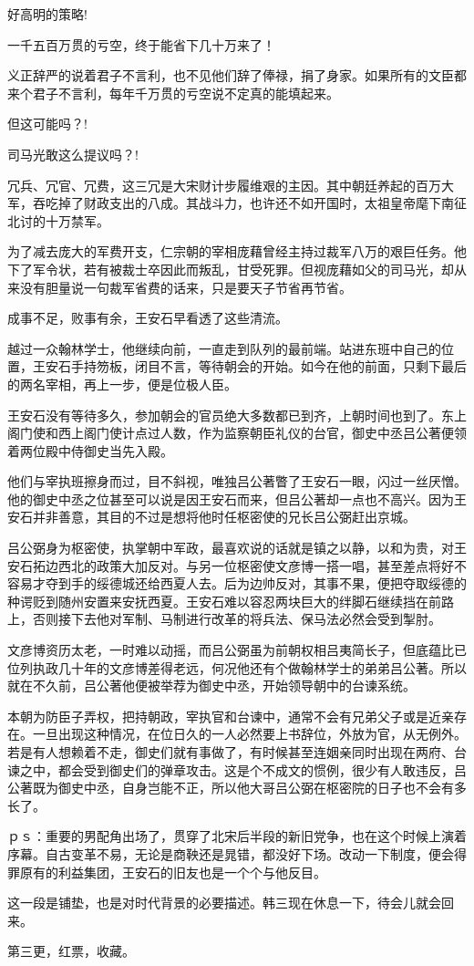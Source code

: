 好高明的策略!

一千五百万贯的亏空，终于能省下几十万来了！

义正辞严的说着君子不言利，也不见他们辞了俸禄，捐了身家。如果所有的文臣都来个君子不言利，每年千万贯的亏空说不定真的能填起来。

但这可能吗？!

司马光敢这么提议吗？!

冗兵、冗官、冗费，这三冗是大宋财计步履维艰的主因。其中朝廷养起的百万大军，吞吃掉了财政支出的八成。其战斗力，也许还不如开国时，太祖皇帝麾下南征北讨的十万禁军。

为了减去庞大的军费开支，仁宗朝的宰相庞藉曾经主持过裁军八万的艰巨任务。他下了军令状，若有被裁士卒因此而叛乱，甘受死罪。但视庞藉如父的司马光，却从来没有胆量说一句裁军省费的话来，只是要天子节省再节省。

成事不足，败事有余，王安石早看透了这些清流。

越过一众翰林学士，他继续向前，一直走到队列的最前端。站进东班中自己的位置，王安石手持笏板，闭目不言，等待朝会的开始。如今在他的前面，只剩下最后的两名宰相，再上一步，便是位极人臣。

王安石没有等待多久，参加朝会的官员绝大多数都已到齐，上朝时间也到了。东上阁门使和西上阁门使计点过人数，作为监察朝臣礼仪的台官，御史中丞吕公著便领着两位殿中侍御史当先入殿。

他们与宰执班擦身而过，目不斜视，唯独吕公著瞥了王安石一眼，闪过一丝厌憎。他的御史中丞之位甚至可以说是因王安石而来，但吕公著却一点也不高兴。因为王安石并非善意，其目的不过是想将他时任枢密使的兄长吕公弼赶出京城。

吕公弼身为枢密使，执掌朝中军政，最喜欢说的话就是镇之以静，以和为贵，对王安石拓边西北的政策大加反对。与另一位枢密使文彦博一搭一唱，甚至差点将好不容易才夺到手的绥德城还给西夏人去。后为边帅反对，其事不果，便把夺取绥德的种谔贬到随州安置来安抚西夏。王安石难以容忍两块巨大的绊脚石继续挡在前路上，否则接下去他对军制、马制进行改革的将兵法、保马法必然会受到掣肘。

文彦博资历太老，一时难以动摇，而吕公弼虽为前朝权相吕夷简长子，但底蕴比已位列执政几十年的文彦博差得老远，何况他还有个做翰林学士的弟弟吕公著。所以就在不久前，吕公著他便被举荐为御史中丞，开始领导朝中的台谏系统。

本朝为防臣子弄权，把持朝政，宰执官和台谏中，通常不会有兄弟父子或是近亲存在。一旦出现这种情况，在位日久的一人必然要上书辞位，外放为官，从无例外。若是有人想赖着不走，御史们就有事做了，有时候甚至连姻亲同时出现在两府、台谏之中，都会受到御史们的弹章攻击。这是个不成文的惯例，很少有人敢违反，吕公著既为御史中丞，自身岂能不正，所以他大哥吕公弼在枢密院的日子也不会有多长了。

ｐｓ：重要的男配角出场了，贯穿了北宋后半段的新旧党争，也在这个时候上演着序幕。自古变革不易，无论是商鞅还是晁错，都没好下场。改动一下制度，便会得罪原有的利益集团，王安石的旧友也是一个个与他反目。

这一段是铺垫，也是对时代背景的必要描述。韩三现在休息一下，待会儿就会回来。

第三更，红票，收藏。

